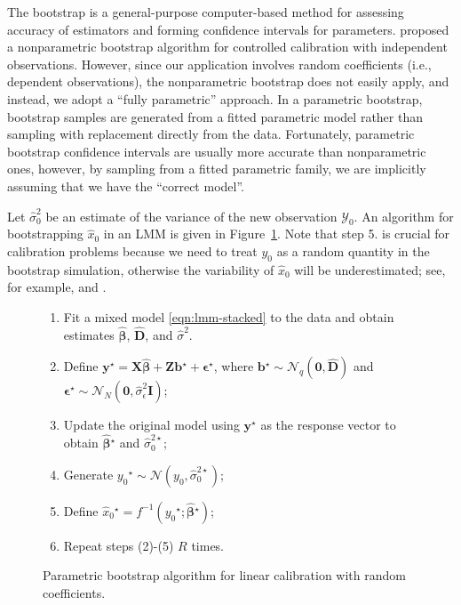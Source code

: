\documentclass{article}\usepackage[]{graphicx}\usepackage[]{color}
\newcommand{\boot}{\ensuremath{^\star}}
\begin{document}
The bootstrap \citep{efron-bootstrap-1979} is a general-purpose computer-based method for assessing accuracy of estimators and forming confidence intervals for parameters.  \citet{jones-bootstrapping-1999} proposed a nonparametric bootstrap algorithm for controlled calibration with independent observations.  However, since our application involves random coefficients (i.e., dependent observations), the nonparametric bootstrap does not easily apply, and instead, we adopt a ``fully parametric'' approach.  In a parametric bootstrap, bootstrap samples are generated from a fitted parametric model rather than sampling with replacement directly from the data.  Fortunately, parametric bootstrap confidence intervals are usually more accurate than nonparametric ones, however, by sampling from a fitted parametric family, we are implicitly assuming that we have the ``correct model''.

Let $\widehat{\sigma}_0^2$ be an estimate of the variance of the new observation $\mathcal{Y}_0$.  An algorithm for bootstrapping $\widehat{x}_0$ in an LMM is given in Figure~\ref{fig:parboot}.  Note that step 5. is crucial for calibration problems because we need to treat $y_0$ as a random quantity in the bootstrap simulation, otherwise the variability of $\widehat{x}_0$ will be underestimated; see, for example, \citet{jones-bootstrapping-1999} and \citet{greenwell-investr-2014}.
\begin{figure}[!htb]
\begin{enumerate}
  \item Fit a mixed model \eqref{eqn:lmm-stacked} to the data and obtain estimates $\widehat{\bm{\beta}}$, $\widehat{\bm{D}}$, and $\widehat{\sigma}^2$.
	\item Define $\bm{y}\boot = \bm{X}\widehat{\bm{\beta}} + \bm{Z}\bm{b}\boot + \bm{\epsilon}\boot$, where $\bm{b}\boot \sim \mathcal{N}_q\left(\bm{0}, \widehat{\bm{D}}\right)$ and $\bm{\epsilon}\boot \sim \mathcal{N}_N\left(\bm{0}, \widehat{\sigma}_\epsilon^2\bm{I}\right)$;
	\item Update the original model using $\bm{y}\boot$ as the response vector to obtain $\widehat{\bm{\beta}}\boot$ and $\widehat{\sigma}_0^{2\star}$;
	\item Generate $y_0\boot \sim \mathcal{N}\left(y_0, \widehat{\sigma}_0^{2\star}\right)$;
	\item Define $\widehat{x}_0\boot = f^{-1}\left(y_0\boot; \widehat{\bm{\beta}}\boot\right)$;
  \item Repeat steps (2)-(5) $R$ times.
\end{enumerate}
\caption{Parametric bootstrap algorithm for linear calibration with random coefficients. \label{fig:parboot}}
\end{figure}
\end{document}

